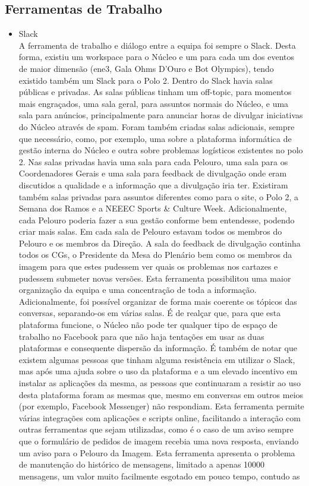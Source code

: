 
\subsection{Ferramentas de Trabalho}

\begin{itemize}
\item Slack\\
A ferramenta de trabalho e diálogo entre a equipa foi sempre o Slack. Desta forma, existiu um workspace para o Núcleo e um para cada um dos eventos de maior dimensão (\acrshort{ene3}, Gala Ohms D'Ouro e Bot Olympics), tendo existido também um Slack para o Polo 2. Dentro do Slack havia salas públicas e privadas. As salas públicas tinham um off-topic, para momentos mais engraçados, uma sala geral, para assuntos normais do Núcleo, e uma sala para anúncios, principalmente para anunciar horas de divulgar iniciativas do Núcleo através de spam. Foram também criadas salas adicionais, sempre que necessário, como, por exemplo, uma sobre a plataforma informática de gestão interna do Núcleo e outra sobre problemas logísticos existentes no polo 2. Nas salas privadas havia uma sala para cada Pelouro, uma sala para os Coordenadores Gerais e uma sala para feedback de divulgação onde eram discutidos a qualidade e a informação que a divulgação iria ter. Existiram também salas privadas para assuntos diferentes como para o site, o Polo 2, a Semana dos Ramos e a NEEEC Sports \& Culture Week. Adicionalmente, cada Pelouro poderia fazer a sua gestão conforme bem entendesse, podendo criar mais salas. Em cada sala de Pelouro estavam todos os membros do Pelouro e os membros da Direção. A sala do feedback de divulgação continha todos os CGs, o Presidente da Mesa do Plenário bem como os membros da imagem para que estes pudessem ver quais os problemas nos cartazes e pudessem submeter novas versões. Esta ferramenta possibilitou uma maior organização da equipa e uma concentração de toda a informação. Adicionalmente, foi possível organizar de forma mais coerente os tópicos das conversas, separando-os em várias salas. É de realçar que, para que esta plataforma funcione, o Núcleo não pode ter qualquer tipo de espaço de trabalho no Facebook para que não haja tentações em usar as duas plataformas e consequente dispersão da informação. É também de notar que existem algumas pessoas que tinham alguma resistência em utilizar o Slack, mas após uma ajuda sobre o uso da plataforma e a um elevado incentivo em instalar as aplicações da mesma, as pessoas que continuaram a resistir ao uso desta plataforma foram as mesmas que, mesmo em conversas em outros meios (por exemplo, Facebook Messenger) não respondiam. Esta ferramenta permite várias integrações com aplicações e scripts online, facilitando a interação com outras ferramentas que sejam utilizadas, como é o caso de um aviso sempre que o formulário de pedidos de imagem recebia uma nova resposta, enviando um aviso para o Pelouro da Imagem. Esta ferramenta apresenta o problema de manutenção do histórico de mensagens, limitado a apenas 10000 mensagens, um valor muito facilmente esgotado em pouco tempo, contudo as 
\end{itemize}
